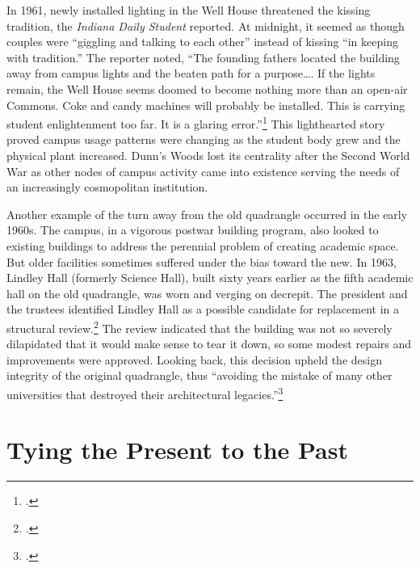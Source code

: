 \documentclass[
  american,
  letterpaper,
]{scrreprt}
\begin{document}
In 1961, newly installed lighting in the Well House threatened the
kissing tradition, the \emph{Indiana Daily Student} reported. At
midnight, it seemed as though couples were ``giggling and talking to
each other'' instead of kissing ``in keeping with tradition.'' The
reporter noted, ``The founding fathers located the building away from
campus lights and the beaten path for a purpose\ldots. If the lights
remain, the Well House seems doomed to become nothing more than an
open-air Commons. Coke and candy machines will probably be installed.
This is carrying student enlightenment too far. It is a glaring
error.''\footnote{.} This
lighthearted story proved campus usage patterns were changing as the
student body grew and the physical plant increased. Dunn's Woods lost
its centrality after the Second World War as other nodes of campus
activity came into existence serving the needs of an increasingly
cosmopolitan institution.

Another example of the turn away from the old quadrangle occurred in the
early 1960s. The campus, in a vigorous postwar building program, also
looked to existing buildings to address the perennial problem of
creating academic space. But older facilities sometimes suffered under
the bias toward the new. In 1963, Lindley Hall (formerly Science Hall),
built sixty years earlier as the fifth academic hall on the old
quadrangle, was worn and verging on decrepit. The president and the
trustees identified Lindley Hall as a possible candidate for replacement
in a structural review.\footnote{.}
The review indicated that the building was not so severely dilapidated
that it would make sense to tear it down, so some modest repairs and
improvements were approved. Looking back, this decision upheld the
design integrity of the original quadrangle, thus ``avoiding the mistake
of many other universities that destroyed their architectural
legacies.''\footnote{.}

\section{Tying the Present to the
Past}\label{tying-the-present-to-the-past}
\end{document}
